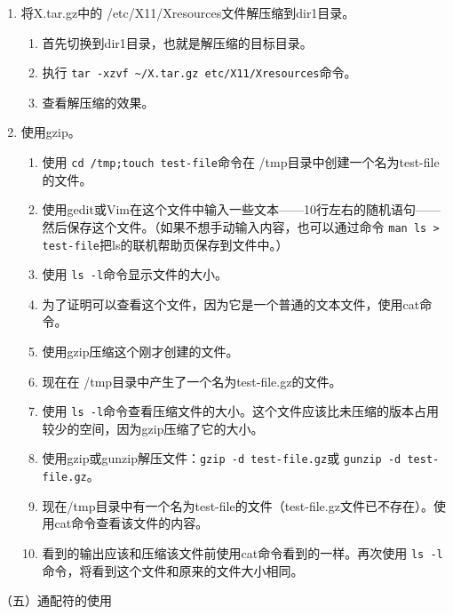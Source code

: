 \begin{enumerate}
\begin{enumerate}
    \end{enumerate}
  \item 将X.tar.gz中的 /etc/X11/Xresources文件解压缩到dir1目录。
    \begin{enumerate}
      \item 首先切换到dir1目录，也就是解压缩的目标目录。
      \item 执行 \verb|tar -xzvf ~/X.tar.gz etc/X11/Xresources|命令。
      \item 查看解压缩的效果。
    \end{enumerate}
  \item 使用gzip。
    \begin{enumerate}
      \item 使用 \verb|cd /tmp;touch test-file|命令在 /tmp目录中创建一个名为test-file的文件。
      \item 使用gedit或Vim在这个文件中输入一些文本——10行左右的随机语句——然后保存这个文件。（如果不想手动输入内容，也可以通过命令 \verb|man ls > test-file|把ls的联机帮助页保存到文件中。）
      \item 使用 \verb|ls -l|命令显示文件的大小。
      \item 为了证明可以查看这个文件，因为它是一个普通的文本文件，使用cat命令。
      \item 使用gzip压缩这个刚才创建的文件。
      \item 现在在 /tmp目录中产生了一个名为test-file.gz的文件。
      \item 使用 \verb|ls -l|命令查看压缩文件的大小。这个文件应该比未压缩的版本占用较少的空间，因为gzip压缩了它的大小。
      \item 使用gzip或gunzip解压文件：\verb|gzip -d test-file.gz|或 \verb|gunzip -d test-file.gz|。
      \item 现在/tmp目录中有一个名为test-file的文件（test-file.gz文件已不存在）。使用cat命令查看该文件的内容。
      \item 看到的输出应该和压缩该文件前使用cat命令看到的一样。再次使用 \verb|ls -l|命令，将看到这个文件和原来的文件大小相同。
    \end{enumerate}
\end{enumerate}

\vspace{0.1in}
（五）通配符的使用

